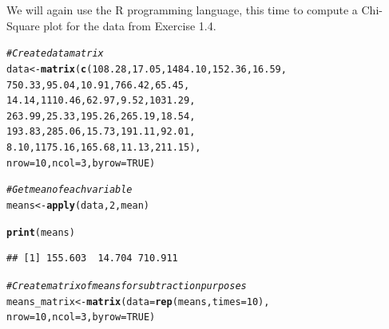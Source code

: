 \documentclass[12pt]{article}\usepackage[]{graphicx}\usepackage[]{color}
\makeatletter
\newcommand{\hlnum}[1]{\textcolor[rgb]{0.686,0.059,0.569}{#1}}%
\newcommand{\hlcom}[1]{\textcolor[rgb]{0.678,0.584,0.686}{\textit{#1}}}%
\newcommand{\hlstd}[1]{\textcolor[rgb]{0.345,0.345,0.345}{#1}}%
\newcommand{\hlkwb}[1]{\textcolor[rgb]{0.69,0.353,0.396}{#1}}%
\newcommand{\hlkwc}[1]{\textcolor[rgb]{0.333,0.667,0.333}{#1}}%
\newcommand{\hlkwd}[1]{\textcolor[rgb]{0.737,0.353,0.396}{\textbf{#1}}}%
\newenvironment{kframe}{%
 \def\at@end@of@kframe{}%
 \ifinner\ifhmode%
  \def\at@end@of@kframe{\end{minipage}}%
  \begin{minipage}{\columnwidth}%
 \fi\fi%
 \def\FrameCommand##1{\hskip\@totalleftmargin \hskip-\fboxsep
 \colorbox{shadecolor}{##1}\hskip-\fboxsep
     \hskip-\linewidth \hskip-\@totalleftmargin \hskip\columnwidth}%
 \MakeFramed {\advance\hsize-\width
   \@totalleftmargin\z@ \linewidth\hsize
   \@setminipage}}%
 {\par\unskip\endMakeFramed%
 \at@end@of@kframe}
\newenvironment{knitrout}{}{} %
\newenvironment{problem}[2][Problem]{\begin{trivlist}
\item[\hskip \labelsep {\bfseries #1}\hskip \labelsep {\bfseries #2.}]}{\end{trivlist}}
\makeatother
\begin{document}

\begin{problem}{4.25}
\end{problem}

We will again use the R programming language, this time to compute a Chi-Square plot for the data from Exercise 1.4.

\begin{knitrout}
\color{fgcolor}\begin{kframe}
\begin{alltt}
\hlcom{#Create data matrix}
\hlstd{data} \hlkwb{<-} \hlkwd{matrix}\hlstd{(}\hlkwd{c}\hlstd{(}\hlnum{108.28}\hlstd{,} \hlnum{17.05}\hlstd{,} \hlnum{1484.10}\hlstd{,} \hlnum{152.36}\hlstd{,} \hlnum{16.59}\hlstd{,}
                 \hlnum{750.33}\hlstd{,} \hlnum{95.04}\hlstd{,} \hlnum{10.91}\hlstd{,} \hlnum{766.42}\hlstd{,} \hlnum{65.45}\hlstd{,}
                 \hlnum{14.14}\hlstd{,} \hlnum{1110.46}\hlstd{,} \hlnum{62.97}\hlstd{,} \hlnum{9.52}\hlstd{,} \hlnum{1031.29}\hlstd{,}
                 \hlnum{263.99}\hlstd{,} \hlnum{25.33}\hlstd{,} \hlnum{195.26}\hlstd{,} \hlnum{265.19}\hlstd{,} \hlnum{18.54}\hlstd{,}
                 \hlnum{193.83}\hlstd{,} \hlnum{285.06}\hlstd{,} \hlnum{15.73}\hlstd{,} \hlnum{191.11}\hlstd{,} \hlnum{92.01}\hlstd{,}
                 \hlnum{8.10}\hlstd{,} \hlnum{1175.16}\hlstd{,} \hlnum{165.68}\hlstd{,} \hlnum{11.13}\hlstd{,} \hlnum{211.15}\hlstd{),}
               \hlkwc{nrow} \hlstd{=} \hlnum{10}\hlstd{,} \hlkwc{ncol} \hlstd{=} \hlnum{3}\hlstd{,} \hlkwc{byrow}\hlstd{=} \hlnum{TRUE}\hlstd{)}

\hlcom{#Get mean of each variable}
\hlstd{means} \hlkwb{<-} \hlkwd{apply}\hlstd{(data,} \hlnum{2}\hlstd{, mean)}

\hlkwd{print}\hlstd{(means)}
\end{alltt}
\begin{verbatim}
## [1] 155.603  14.704 710.911
\end{verbatim}
\begin{alltt}
\hlcom{#Create matrix of means for subtraction purposes}
\hlstd{means_matrix} \hlkwb{<-} \hlkwd{matrix}\hlstd{(}\hlkwc{data} \hlstd{=} \hlkwd{rep}\hlstd{(means,} \hlkwc{times} \hlstd{=} \hlnum{10}\hlstd{),}
                       \hlkwc{nrow} \hlstd{=} \hlnum{10}\hlstd{,} \hlkwc{ncol} \hlstd{=} \hlnum{3}\hlstd{,} \hlkwc{byrow} \hlstd{=} \hlnum{TRUE}\hlstd{)}


\end{alltt}
\end{kframe}
\end{knitrout}
\end{document}
